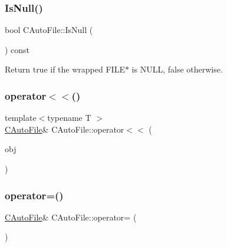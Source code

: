 \mbox{\label{class_c_auto_file_a7fd47268b6d85a89acafdb73559f8e78}} 
\subsubsection{\texorpdfstring{Is\+Null()}{IsNull()}}
{\footnotesize\ttfamily bool C\+Auto\+File\+::\+Is\+Null (\begin{DoxyParamCaption}{ }\end{DoxyParamCaption}) const\hspace{0.3cm}{\ttfamily [inline]}}

Return true if the wrapped F\+I\+L\+E$\ast$ is N\+U\+LL, false otherwise. \mbox{\label{class_c_auto_file_a8e194596d1f8f64059247724b25df82c}} 
\subsubsection{\texorpdfstring{operator$<$$<$()}{operator<<()}}
{\footnotesize\ttfamily template$<$typename T $>$ \\
\mbox{\hyperlink{class_c_auto_file}{C\+Auto\+File}}\& C\+Auto\+File\+::operator$<$$<$ (\begin{DoxyParamCaption}\item[{const T \&}]{obj }\end{DoxyParamCaption})\hspace{0.3cm}{\ttfamily [inline]}}

\mbox{\label{class_c_auto_file_a5937561da10e79c2da4bb47c0fc57d96}} 
\subsubsection{\texorpdfstring{operator=()}{operator=()}}
{\footnotesize\ttfamily \mbox{\hyperlink{class_c_auto_file}{C\+Auto\+File}}\& C\+Auto\+File\+::operator= (\begin{DoxyParamCaption}\item[{const \mbox{\hyperlink{class_c_auto_file}{C\+Auto\+File}} \&}]{ }\end{DoxyParamCaption})\hspace{0.3cm}{\ttfamily [private]}}


